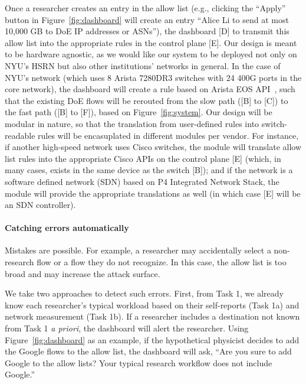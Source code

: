 Once a researcher creates an entry in the allow list (e.g., clicking the ``Apply'' button in Figure~\ref{fig:dashboard} will create an entry ``Alice Li to send at most 10,000 GB to DoE IP addresses or ASNs''), the dashboard [D] to transmit this allow list into the appropriate rules in the control plane [E]. Our design is meant to be hardware agnostic, as we would like our system to be deployed not only on NYU's HSRN but also other institutions' networks in general. In the case of NYU's network (which uses 8 Arista 7280DR3 switches with 24 400G ports in the core network), the dashboard will create a rule based on Arista EOS API~\cite{aristaswitch}, such that the existing DoE flows will be rerouted from the slow path ([B] to [C]) to the fast path ([B] to [F]), based on Figure~\ref{fig:system}. Our design will be modular in nature, so that the translation from user-defined rules into switch-readable rules will be encasuplated in different modules per vendor. For instance, if another high-speed network uses Cisco switches, the module will translate allow list rules into the appropriate Cisco APIs on the control plane [E] (which, in many cases, exists in the same device as the switch [B]); and if the network is a software defined network (SDN) based on P4 Integrated Network Stack, the module will provide the appropriate translations as well (in which case [E] will be an SDN controller).




\paragraph{Catching errors automatically}
Mistakes are possible. For example, a researcher may accidentally select a non-research flow or a flow they do not recognize. In this case, the allow list is too broad and may increase the attack surface.

We take two approaches to detect such errors. First, from Task 1, we already know each researcher's typical workload based on their self-reports (Task 1a) and network measurement (Task 1b). If a researcher includes a destination not known from Task 1 \textit{a priori}, the dashboard will alert the researcher. Using Figure~\ref{fig:dashboard} as an example, if the hypothetical physicist decides to add the Google flows to the allow list, the dashboard will ask, ``Are you sure to add Google to the allow lists? Your typical research workflow does not include Google.''

